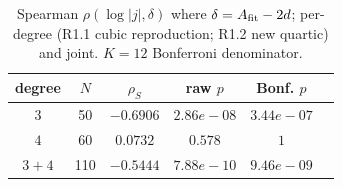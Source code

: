 \begin{table}[h]
\centering
\caption{Spearman $\rho(\log|j|, \delta)$ where $\delta = A_{\rm fit} - 2d$;
per-degree (R1.1 cubic reproduction; R1.2 new quartic) and joint.
$K=12$ Bonferroni denominator.}
\label{tab:r12-correlation}
\begin{tabular}{cccccc}
\hline
degree & $N$ & $\rho_S$ & raw $p$ & Bonf. $p$ \\
\hline
  $3$ & 50 & $-0.6906$ & $2.86e-08$ & $3.44e-07$ \\
  $4$ & 60 & $0.0732$ & $0.578$ & $1$ \\
  $3+4$ & 110 & $-0.5444$ & $7.88e-10$ & $9.46e-09$ \\
\hline
\end{tabular}
\end{table}
